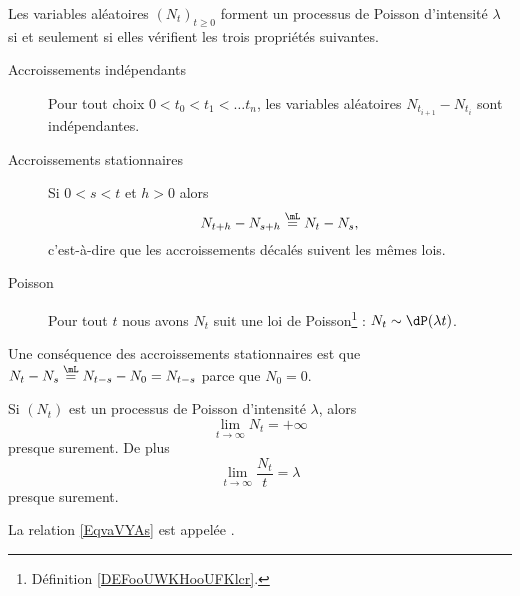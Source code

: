 \begin{theorem}     \label{THOooVDMCooVycibj}
	Les variables aléatoires \( (N_t)_{t\geq 0}\) forment un processus de Poisson d'intensité \( \lambda\) si et seulement si elles vérifient les trois propriétés suivantes.
	\begin{description}
		\item[Accroissements indépendants] Pour tout choix \( 0<t_0<t_1<\ldots t_n\), les variables aléatoires \( N_{t_{i+1}}-N_{t_i}\) sont indépendantes.
		\item[Accroissements stationnaires] Si \( 0<s<t\) et \( h>0\) alors
		      \begin{equation}
			      N_{t+h}-N_{s+h}\stackrel{\mL}{=}N_t-N_s,
		      \end{equation}
		      c'est-à-dire que les accroissements décalés suivent les mêmes lois.
          \item[Poisson] Pour tout \( t\) nous avons \( N_t\) suit une loi de Poisson\footnote{Définition \ref{DEFooUWKHooUFKlcr}.} : \( N_t\sim\dP(\lambda t)\).
	\end{description}
\end{theorem}
Une conséquence des accroissements stationnaires est que \( N_t-N_s\stackrel{\mL}{=}N_{t-s}-N_0=N_{t-s}\) parce que \( N_0=0\).

\begin{proposition}
	Si \( (N_t)\) est un processus de Poisson d'intensité \( \lambda\), alors
	\begin{equation}
		\lim_{t\to \infty} N_t=+\infty
	\end{equation}
	presque surement. De plus
	\begin{equation}        \label{EqvaVYAs}
		\lim_{t\to \infty} \frac{ N_t }{ t }=\lambda
	\end{equation}
	presque surement.
\end{proposition}
La relation \eqref{EqvaVYAs} est appelée .

